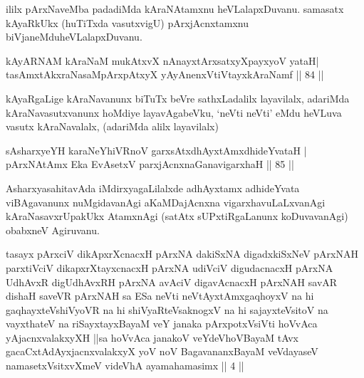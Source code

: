 \begin{artha}
ililx pArxNaveMba padadiMda kAraNAtamxnu heVLalapxDuvanu. samasatx kAyaRkUkx (huTiTxda vasutxvigU) pArxjAcnxtamxnu biVjaneMdu\break heVLalapxDuvanu.
\end{artha}


\begin{shl}
kAyARNAM kAraNaM mukAtxvX nAnayxtArxsatxyXpayxyoV yataH|\\
tasAmxtAkxraNasaMpArxpAtxyX yAyAnenxVtiVtayxkAraNamf \hfill || 84 || 
\end{shl}

\begin{artha}
kAyaRgaLige kAraNavanunx biTuTx beVre sathxLadalilx layavilalx, adariMda kAraNavasutxvanunx hoMdiye layavAgabeVku, `neVti neVti' eMdu heVLuva vasutx kAraNavalalx, (adariMda alilx layavilalx)
\end{artha}


\begin{shl}
sAsharxyeYH karaNeYhiVRnoV garxsAtxdhAyxtAmxdhideYvataH |\\
pArxNAtAmx Eka EvA\s \s setxV parxjAcnxnaGanavigarxhaH \hfill || 85 || 
\end{shl}

\begin{artha}
AsharxyasahitavAda iMdirxyagaLilalxde adhAyxtamx adhideYvata viBAgavanunx nuMgidavanAgi aKaMDajAcnxna vigarxhavuLaLxvanAgi kAraNa\break savxrUpakUkx AtamxnAgi (satAtx sUPxtiRgaLanunx koDuvavanAgi) obabxneV Agiruvanu.
\end{artha}

\begin{kandikeshl}
tasayx pArxciV dikApxrXcnacxH pArxNA dakiSxNA digadxkiSxNeV pArxNAH parxtiVciV dikapxrXtayxcnacxH pArxNA udiVciV digudacnacxH pArxNA UdhAvxR digUdhAvxRH pArxNA avAciV digavAcnacxH pArxNAH savAR dishaH saveVR pArxNAH sa ESa neVti neVtAyxtAmx\s gaqhoyxV na hi gaqhayxteV\s shiVyoVR na hi shiVyaRteV\s saknogxV na hi sajayxteV\s sitoV na vayxthateV na riSayxtayxBayaM veY janaka pArxpotxV\s siVti hoVvAca yAjacnxvalakxyXH ||sa hoVvAca janakoV veYdeVhoV\s BayaM tAvx gacaCxtAdAyxjacnxvalakxyX yoV noV BagavananxBayaM veVdayaseV namasetxV\s sitxvXmeV videVhA ayamahamasimx || 4 ||
\end{kandikeshl}

